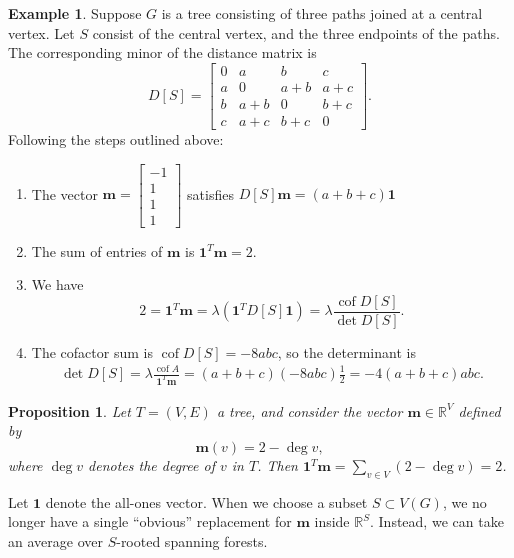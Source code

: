 \documentclass{amsart}
\newtheorem{prop}[thm]{Proposition}
\theoremstyle{definition}
\newtheorem{eg}[thm]{Example}
\newcommand{\RR}{\mathbb{R}}
\DeclareMathOperator{\cof}{cof}
\begin{document}
\begin{eg}
Suppose $G$ is a tree consisting of three paths joined at a central vertex.
Let $S$ consist of the central vertex, and the three endpoints of the paths. 
The corresponding minor of the distance matrix is
$$
D[S] = \begin{bmatrix}
0 & a & b & c \\
a & 0 & a + b & a + c \\
b & a + b & 0 & b + c \\
c & a + c & b + c & 0
\end{bmatrix}.
$$
Following the steps outlined above:
\begin{enumerate}
\item 
The vector $\mathbf{m} = \begin{bmatrix} -1 \\ 1 \\ 1 \\ 1 \end{bmatrix}$ satisfies
$
D[S] \mathbf{m} = (a+b+c) \mathbf{1}
$

\item 
The sum of entries of $\mathbf{m}$ is $\mathbf{1}^T \mathbf{m} = 2$.

\item 
We have 
$$2 = \mathbf{1}^T \mathbf{m} = \lambda (\mathbf{1}^T D[S] \mathbf{1}) = \displaystyle \lambda \frac{\cof D[S]}{\det D[S]}.$$

\item 
The cofactor sum is 
$\cof D[S] = -8 abc$,
so the determinant is
\begin{align*}
\det D[S] 
= \lambda \frac{\cof A}{\mathbf{1}^T \mathbf{m}}
= (a+b+c) (-8 abc)\frac{1}{2}
= -4(a+b+c)abc.
\end{align*}
\end{enumerate}
\end{eg}

\begin{prop}
Let $T = (V,E)$ a tree, and consider the vector $\mathbf{m} \in \RR^V$
defined by 
\begin{equation*}
\mathbf{m}(v) = 2 - \deg v,
\end{equation*}
where $\deg v$ denotes the degree of $v$ in $T$.
Then $\mathbf{1}^T \mathbf{m} = \sum_{v \in V} (2-\deg v) = 2$.
\end{prop}

Let $\mathbf{1}$ denote the all-ones vector.
When we choose a subset $S \subset V(G)$, we no longer have a single ``obvious'' replacement for $\mathbf{m}$ inside $\RR^S$.
Instead, we can take an average over $S$-rooted spanning forests.
\end{document}
